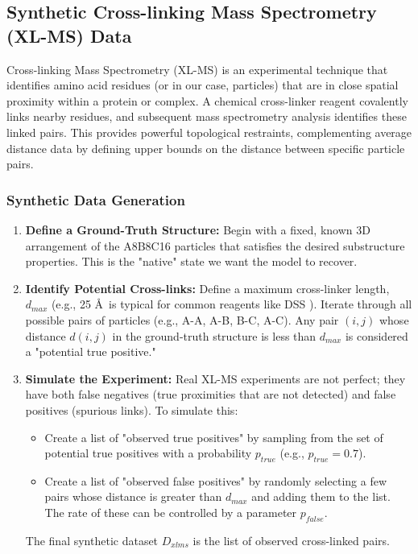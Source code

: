 \documentclass{article}
\begin{document}
\subsection{Synthetic Cross-linking Mass Spectrometry (XL-MS) Data}

Cross-linking Mass Spectrometry (XL-MS) is an experimental technique that identifies amino acid residues (or in our case, particles) that are in close spatial proximity within a protein or complex.\cite{ref24} A chemical cross-linker reagent covalently links nearby residues, and subsequent mass spectrometry analysis identifies these linked pairs. This provides powerful topological restraints, complementing average distance data by defining upper bounds on the distance between specific particle pairs.\cite{ref26}

\subsubsection{Synthetic Data Generation}

\begin{enumerate}
  \item \textbf{Define a Ground-Truth Structure:} Begin with a fixed, known 3D arrangement of the A8B8C16 particles that satisfies the desired substructure properties. This is the "native" state we want the model to recover.
  \item \textbf{Identify Potential Cross-links:} Define a maximum cross-linker length, $d_{max}$ (e.g., 25 \AA\ is typical for common reagents like DSS \cite{ref26}). Iterate through all possible pairs of particles (e.g., A-A, A-B, B-C, A-C). Any pair $(i, j)$ whose distance $d(i, j)$ in the ground-truth structure is less than $d_{max}$ is considered a "potential true positive."
  \item \textbf{Simulate the Experiment:} Real XL-MS experiments are not perfect; they have both false negatives (true proximities that are not detected) and false positives (spurious links). To simulate this:
    \begin{itemize}
      \item Create a list of "observed true positives" by sampling from the set of potential true positives with a probability $p_{true}$ (e.g., $p_{true} = 0.7$).
      \item Create a list of "observed false positives" by randomly selecting a few pairs whose distance is greater than $d_{max}$ and adding them to the list. The rate of these can be controlled by a parameter $p_{false}$.
    \end{itemize}
    The final synthetic dataset $D_{xlms}$ is the list of observed cross-linked pairs.
\end{enumerate}
\end{document}
